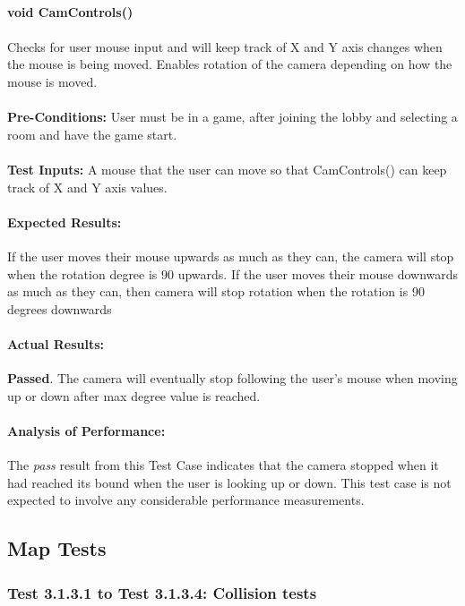 \documentclass{article}
\begin{document}
    \paragraph{}\textbf{void CamControls()}
    \paragraph{} Checks for user mouse input and will keep track of X and Y axis changes when the mouse is being moved. Enables rotation of the camera depending on how the mouse is moved.
    \paragraph{}\textbf{Pre-Conditions:} User must be in a game, after joining the lobby and selecting a room and have the game start.
    \paragraph{}\textbf{Test Inputs:} A mouse that the user can move so that CamControls() can keep track of X and Y axis values.
    \paragraph{Expected Results:} If the user moves their mouse upwards as much as they can, the camera will stop when the rotation degree is 90 upwards. If the user moves their mouse downwards as much as they can, then camera will stop rotation when the rotation is 90 degrees downwards
    \paragraph{Actual Results:} \textbf{Passed}. The camera will eventually stop following the user's mouse when moving up or down after max degree value is reached.
    \paragraph{Analysis of Performance:} The \emph{pass} result from this Test Case indicates that the camera stopped when it had reached its bound when the user is looking up or down. This test case is not expected to involve any considerable performance measurements. 
    
    \subsection{Map Tests}
    \subsubsection{Test 3.1.3.1 to Test 3.1.3.4: Collision tests}
\end{document}
